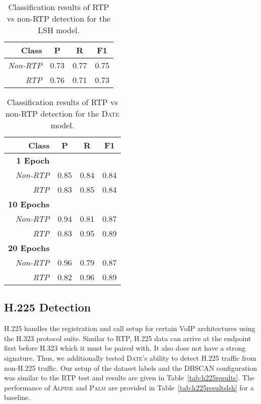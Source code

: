\begin{table} [h!]
\centering
\begin{tabular}{| r | c | c | c |}
\hline
Class & P & R & F1 \\
\hline
\textit{Non-RTP} & 0.73 & 0.77 & 0.75 \\
\textit{RTP} & 0.76 & 0.71 & 0.73 \\
\hline
\end{tabular}
\caption{Classification results of RTP vs non-RTP detection for the LSH model.}
\label{tab:rtpresultslsh}
\end{table}

\begin{table} [h!]
\centering
\begin{tabular}{| r | c | c | c |}
\hline
Class & P & R & F1 \\
\hline
\textbf{1 Epoch} &&& \\
\textit{Non-RTP} & 0.85 & 0.84 & 0.84 \\
\textit{RTP} & 0.83 & 0.85 & 0.84 \\
\hline
\textbf{10 Epochs} &&& \\
\textit{Non-RTP} & 0.94 & 0.81 & 0.87 \\
\textit{RTP} & 0.83 & 0.95 & 0.89 \\
\hline
\textbf{20 Epochs} &&& \\
\textit{Non-RTP} & 0.96 & 0.79 & 0.87 \\
\textit{RTP} & 0.82 & 0.96 & 0.89 \\
\hline
\end{tabular}
\caption{Classification results of RTP vs non-RTP detection for the \textsc{Date} model.}
\label{tab:rtpresults}
\end{table}

\subsection{H.225 Detection}
H.225 handles the registration and call setup for certain VoIP architectures using the H.323 protocol suite. Similar to RTP, H.225 data can arrive at the endpoint first before H.323 which it must be paired with. It also does not have a strong signature. Thus, we additionally tested \textsc{Date}'s ability to detect H.225 traffic from non-H.225 traffic. Our setup of the dataset labels and the DBSCAN configuration was similar to the RTP test and results are given in Table~\ref{tab:h225results}. The performance of \textsc{Alpine} and \textsc{Palm} are provided in Table~\ref{tab:h225resultslsh} for a baseline.

